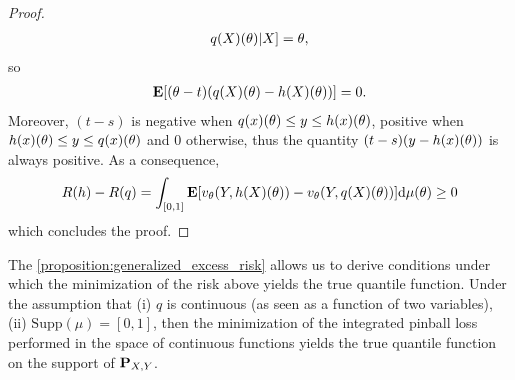 \begin{proof}
\begin{align*}
{        q(X)(\ensuremath{\theta}) | X]} = \theta,
    \end{align*}
    so
    \begin{align*}
        \mathbf{{E}}{[(\theta - t)(q(X)(\theta) -
        h(X)(\theta))]} =0.
    \end{align*}
    Moreover, $(t-s)$ is negative when $q(x)(\theta) \leq y \leq
    h(x)(\theta)$, positive when $h(x)(\theta) \leq y \leq
    q(x)(\theta)$ and $0$ otherwise, thus the quantity
    $(t-s)(y-h(x)(\theta))$ is always positive. As a consequence,
    \begin{dmath*}[compact]
        R(h) - R(q) = \int_{[0,1]}
        \expectation{[v_{\hyperparameter}(Y,h(X)(\hyperparameter)) -
        v_{\hyperparameter}(Y,q(X)(\hyperparameter))]} \mathrm{d}
        \mu(\hyperparameter) \geq 0
    \end{dmath*}
    which concludes the proof.
\end{proof}
The \cref{proposition:generalized_excess_risk} allows us to derive conditions
under which the minimization of the risk above yields the true quantile
function. Under the assumption that (i) $q$ is continuous (as seen as a
function of two variables), (ii) $\mathrm{Supp}(\mu) = [0,1] $, then the
minimization of the integrated pinball loss performed in the space of
continuous functions yields the true quantile function on the support of
$\mathbf{{P}}_{X,Y}$.
